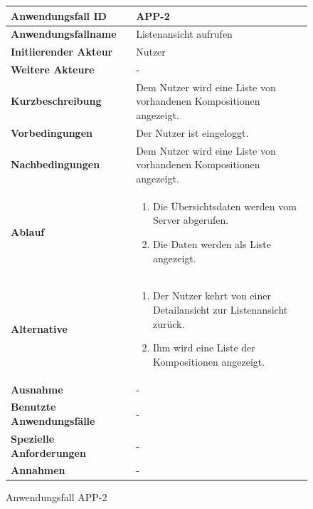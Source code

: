 \newpage

\begin{figure}[h]
	\centering
	\begin{tabularx}{\textwidth}{ X | X }
		\textbf{Anwendungsfall ID} & APP-2 \\ \hline
		\textbf{Anwendungsfallname} & Listenansicht aufrufen \\ \hline
		\textbf{Initiierender Akteur} & Nutzer \\ \hline
		\textbf{Weitere Akteure} & -  \\ \hline
		\textbf{Kurzbeschreibung} & Dem Nutzer wird eine Liste von vorhandenen Kompositionen angezeigt.  \\ \hline
		\textbf{Vorbedingungen} & Der Nutzer ist eingeloggt.  \\ \hline
		\textbf{Nachbedingungen} & Dem Nutzer wird eine Liste von vorhandenen Kompositionen angezeigt.  \\ \hline
		\textbf{Ablauf} &
		\begin{enumerate}
			\item Die Übersichtsdaten werden vom Server abgerufen.
			\item Die Daten werden als Liste angezeigt.
		\end{enumerate} \\ \hline
		\textbf{Alternative} &
		\begin{enumerate}
			\item Der Nutzer kehrt von einer Detailansicht zur Listenansicht zurück.
			\item Ihm wird eine Liste der Kompositionen angezeigt.
		\end{enumerate}  \\ \hline
		\textbf{Ausnahme} &
		-  \\ \hline
		\textbf{Benutzte Anwendungsfälle} & - \\ \hline
		\textbf{Spezielle Anforderungen} & - \\ \hline
		\textbf{Annahmen} & -
	\end{tabularx}
	\caption{Anwendungsfall APP-2}
	\label{fig:anwendungsfall-app-tabelle-APP-2}
\end{figure}

\newpage

